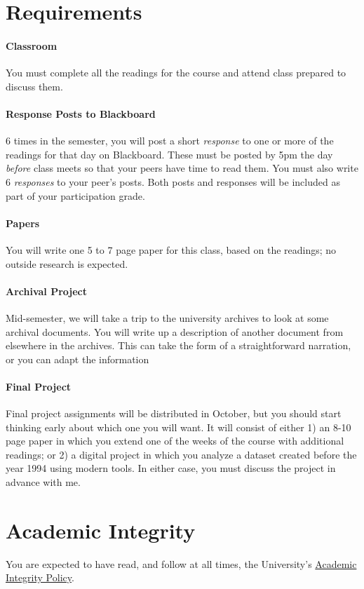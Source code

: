 \section{Requirements}

\paragraph{Classroom}

You must complete all the readings for the course and attend class
prepared to discuss them.

\paragraph{Response Posts to Blackboard}

6 times in the semester, you will post a short \emph{response} to one or
more of the readings for that day on Blackboard. These must be posted by
5pm the day \emph{before} class meets so that your peers have time to
read them. You must also write 6 \emph{responses} to your peer's posts.
Both posts and responses will be included as part of your participation
grade.

\paragraph{Papers}

You will write one 5 to 7 page paper for this class, based on the
readings; no outside research is expected.

\paragraph{Archival Project}

Mid-semester, we will take a trip to the university archives to look at
some archival documents. You will write up a description of another
document from elsewhere in the archives. This can take the form of a
straightforward narration, or you can adapt the information

\paragraph{Final Project}

Final project assignments will be distributed in October, but you should
start thinking early about which one you will want. It will consist of
either 1) an 8-10 page paper in which you extend one of the weeks of the
course with additional readings; or 2) a digital project in which you
analyze a dataset created before the year 1994 using modern tools. In
either case, you must discuss the project in advance with me.

\section{Academic Integrity}

You are expected to have read, and follow at all times, the University's
\href{http://www.northeastern.edu/osccr/academicintegrity/index.html}{Academic
Integrity Policy}.
